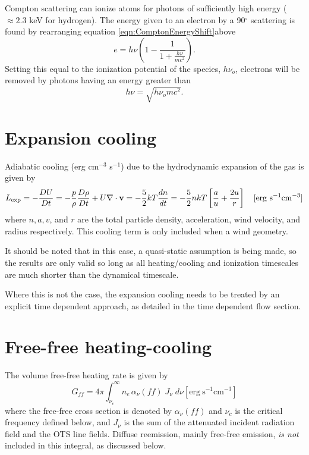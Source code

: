 Compton scattering can ionize atoms for photons of sufficiently high
energy ($\approx 2.3$ keV for hydrogen).  The energy given to an electron
by a 90$^{\circ}$
scattering is found by rearranging equation \ref{eqn:ComptonEnergyShift}above
\begin{equation}
e = h\nu \left( {1 - \frac{1}{{1 + \frac{{h\nu }}{{m{c^2}}}}}} \right).
\end{equation}
Setting this equal to the ionization potential of the species, $h{\nu _o}$,
electrons will be removed by photons having an energy greater than
\begin{equation}
h\nu  = \sqrt {h{\nu _o}m{c^2}}.
\end{equation}

\section{Expansion cooling }

Adiabatic cooling (erg cm$^{-3}$ s$^{-1}$) due to the hydrodynamic expansion of
the gas is given by
\begin{equation}
{L_{\rm exp}} =  - \frac{{DU}}{{Dt}} =  - \frac{p}{\rho }\frac{{D\rho
}}{{Dt}} + U\nabla  \cdot {\bf{v}} = -{5\over2} kT\frac{{dn}}{{dt}} 
= -{5\over2}nkT\left[
{\frac{a}{u} + \frac{{2u}}{r}} \right]\quad [\mathrm{erg~s}^{-1} \mathrm{cm}^{-3}]
\end{equation}
where $n, a, v$, and $r$ are the total particle density, acceleration,
wind velocity, and radius respectively.  This cooling term is only
included when a wind geometry.  

It should be noted that in this case, a quasi-static assumption is
being made, so the results are only valid so long as all
heating/cooling and ionization timescales are much shorter than the
dynamical timescale.  

Where this is not the case, the expansion cooling needs to be treated
by an explicit time dependent approach, as detailed in the time
dependent flow section.

\section{Free-free heating-cooling}

The volume free-free heating rate is given by
\begin{equation}
{G_{ff}} = 4\pi \int_{{\nu _c}}^\infty  {{n_e}\,{\alpha _\nu }\left( {ff}
\right)\;{J_\nu }\;d\nu } [\mathrm{erg~s}^{-1} \mathrm{cm}^{-3}]
\end{equation}
where the free-free cross section is denoted by $\alpha_\nu(ff)$ and $\nu_c$ is the critical
frequency defined below, and $J_{\nu}$ is the sum of the attenuated incident
radiation field and the OTS line fields.  Diffuse reemission, mainly
free-free emission, \emph{is not} included in this integral, as discussed below.

